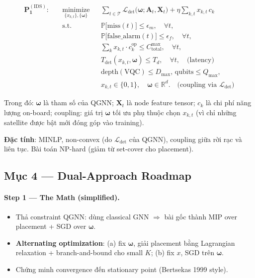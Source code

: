 \documentclass[11pt,a4paper]{article}
\begin{document}
$$
\begin{aligned}
\mathbf{P_1^{(\mathrm{IDS})}}: \quad
& \underset{\{x_{k,t}\}, \{\boldsymbol{\omega}\}}{\text{minimize}}
  && \sum_{t \in \mathcal{T}} \mathcal{L}_{\mathrm{det}}\big(\boldsymbol{\omega}; \mathbf{A}_t, \mathbf{X}_t\big)
     + \eta \sum_{k,t} x_{k,t} \, c_k \\
& \text{s.t.}
  && \mathbb{P}\big[ \mathrm{miss}(t) \big] \leq \epsilon_m, \quad \forall t, \\
&  && \mathbb{P}\big[ \mathrm{false\_alarm}(t) \big] \leq \epsilon_f, \quad \forall t, \\
&  && \sum_{k} x_{k,t} \cdot c_k^{\mathrm{op}} \leq C_{\mathrm{total}}^{\max}, \quad \forall t, \\
&  && T_{\mathrm{det}}(x_{k,t}, \boldsymbol{\omega}) \leq T_d, \quad \forall t, \quad \text{(latency)} \\
&  && \mathrm{depth}(\mathrm{VQC}) \leq D_{\max}, \, \mathrm{qubits} \leq Q_{\max}, \\
&  && x_{k,t} \in \{0,1\}, \quad \boldsymbol{\omega} \in \mathbb{R}^d. \quad \text{(coupling via } \mathcal{L}_{\mathrm{det}}\text{)}
\end{aligned}
$$

Trong đó: $\boldsymbol{\omega}$ là tham số của QGNN; $\mathbf{X}_t$ là node feature tensor; $c_k$ là chi phí năng lượng on-board; coupling: giá trị $\boldsymbol{\omega}$ tối ưu phụ thuộc chọn $x_{k,t}$ (vì chỉ những satellite được bật mới đóng góp vào training).

\textbf{Đặc tính}: MINLP, non-convex (do $\mathcal{L}_{\mathrm{det}}$ của QGNN), coupling giữa rời rạc và liên tục. Bài toán NP-hard (giảm từ set-cover cho placement).

\subsection{Mục 4 --- Dual-Approach Roadmap}

\paragraph{Step 1 --- The Math (simplified).}
\begin{itemize}
  \item Thả constraint QGNN: dùng classical GNN $\Rightarrow$ bài gốc thành MIP over placement + SGD over $\boldsymbol{\omega}$.
  \item \textbf{Alternating optimization}: (a) fix $\boldsymbol{\omega}$, giải placement bằng Lagrangian relaxation + branch-and-bound cho small $K$; (b) fix $x$, SGD trên $\boldsymbol{\omega}$.
  \item Chứng minh convergence đến stationary point (Bertsekas 1999 style).
\end{itemize}
\end{document}
